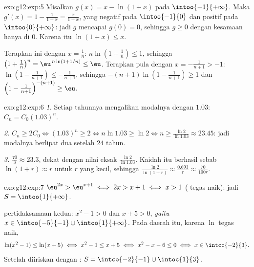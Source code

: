 \begin{solution}{exo:g12:exp:5}
Misalkan $g(x) = x - \ln(1+x)$ pada $\intoo{-1}{+\infty}$. Maka
$g'(x) = 1 - \frac{1}{1+x} = \frac{x}{1+x}$, yang negatif pada
$\intoo{-1}{0}$ dan positif pada $\intoo{0}{+\infty}$: jadi $g$ mencapai
 $g(0) = 0$, sehingga $g \geq 0$ dengan kesamaan hanya di $0$. Karena
itu $\ln(1+x) \leq x$.

Terapkan ini dengan $x = \frac1n$:
$n\ln\left(1 + \frac1n\right) \leq 1$, sehingga
$\left(1+\frac1n\right)^n = \eu^{\,n\ln(1+1/n)} \leq \eu$.
Terapkan pula dengan $x = -\frac{1}{n+1} > -1$:
$\ln\left(1 - \frac{1}{n+1}\right) \leq -\frac{1}{n+1}$, sehingga
$-(n+1)\ln\left(1 - \frac{1}{n+1}\right) \geq 1$ dan
$\left(1 - \frac{1}{n+1}\right)^{-(n+1)} \geq \eu$.
\end{solution}

\begin{solution}{exo:g12:exp:6}
\emph{1.} Setiap tahunnya mengalikan modalnya dengan $1.03$: $C_n = C_0 (1.03)^n$.

\emph{2.} $C_n \geq 2C_0 \iff (1.03)^n \geq 2 \iff n \ln 1.03 \geq \ln 2
\iff n \geq \frac{\ln 2}{\ln 1.03} \approx 23.45$: jadi modalnya berlipat dua
setelah $24$ tahun.

\emph{3.} $\frac{70}{3} \approx 23.3$, dekat dengan nilai eksak
$\frac{\ln 2}{\ln 1.03}$. Kaidah itu berhasil sebab
$\ln(1 + r) \approx r$ untuk $r$ yang kecil, sehingga
$\frac{\ln 2}{\ln(1+r)} \approx \frac{0.693}{r} \approx \frac{70}{100r}$.
\end{solution}

\begin{solution}{exo:g12:exp:7}
$\eu^{2x} > \eu^{x+1} \iff 2x > x + 1 \iff x > 1$ ( tegas
naik): jadi $S = \intoo{1}{+\infty}$.

 pertidaksamaan kedua: $x^2 - 1 > 0$ dan $x + 5 > 0$, \emph{yaitu}
$x \in \intoo{-5}{-1} \cup \intoo{1}{+\infty}$. Pada daerah itu, karena $\ln$
tegas naik,
\[
\ln(x^2-1) \leq \ln(x+5) \iff x^2 - 1 \leq x + 5 \iff x^2 - x - 6 \leq 0
\iff x \in \intcc{-2}{3}.
\]
Setelah diiriskan dengan : $S = \intco{-2}{-1} \cup \intoc{1}{3}$.
\end{solution}

